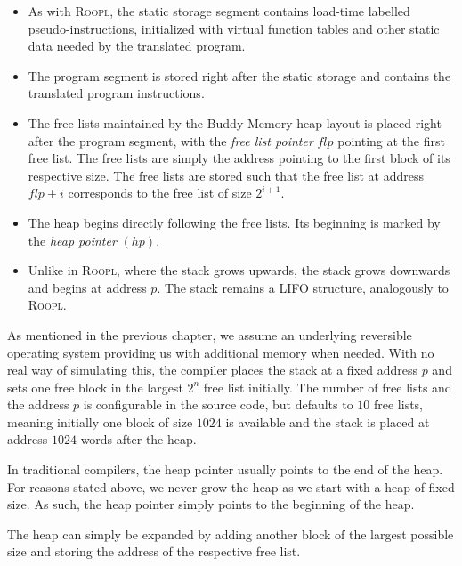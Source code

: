 \begin{itemize}
    \item As with \textsc{Roopl}, the static storage segment contains load-time labelled  pseudo-instructions, initialized with virtual function tables and other static data needed by the translated program.

    \item The program segment is stored right after the static storage and contains the translated \rooplpp program instructions.

    \item The free lists maintained by the Buddy Memory heap layout is placed right after the program segment, with the \textit{free list pointer} $flp$ pointing at the first free list. The free lists are simply the address pointing to the first block of its respective size. The free lists are stored such that the free list at address $flp + i$ corresponds to the free list of size $2^{i+1}$.   

    \item The heap begins directly following the free lists. Its beginning is marked by the \textit{heap pointer} $(hp)$. 

    \item Unlike in \textsc{Roopl}, where the stack grows upwards, the \rooplpp stack grows downwards and begins at address $p$. The stack remains a LIFO structure, analogously to \textsc{Roopl}.
\end{itemize}

As mentioned in the previous chapter, we assume an underlying reversible operating system providing us with additional memory when needed. With no real way of simulating this, the \rooplpp compiler places the stack at a fixed address $p$ and sets one free block in the largest $2^n$ free list initially. The number of free lists and the address $p$ is configurable in the source code, but defaults to $10$ free lists, meaning initially one block of size $1024$ is available and the stack is placed at address $1024$ words after the heap.

In traditional compilers, the heap pointer usually points to the end of the heap. For reasons stated above, we never grow the heap as we start with a heap of fixed size. As such, the heap pointer simply points to the beginning of the heap.

The heap can simply be expanded by adding another block of the largest possible size and storing the address of the respective free list.

